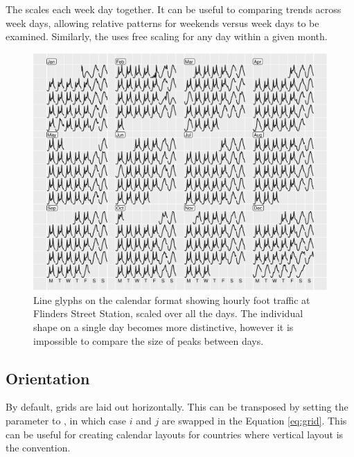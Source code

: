 The  scales each week day together. It can be useful to
comparing trends across week days, allowing relative patterns for
weekends versus week days to be examined. Similarly, the
 uses free scaling for any day within a given month.

\begin{Schunk}
\begin{figure}

{\centering \includegraphics[width=\textwidth]{figure/flinders-free-1} 

}

\caption[Line glyphs on the calendar format showing hourly foot traffic at Flinders Street Station, scaled over all the days]{Line glyphs on the calendar format showing hourly foot traffic at Flinders Street Station, scaled over all the days. The individual shape on a single day becomes more distinctive, however it is impossible to compare the size of peaks between days.}\label{fig:flinders-free}
\end{figure}
\end{Schunk}

\hypertarget{orientation}{%
\subsection{Orientation}\label{orientation}}

By default, grids are laid out horizontally. This can be transposed by
setting the  parameter to , in which case \(i\) and
\(j\) are swapped in the Equation \ref{eq:grid}. This can be useful for
creating calendar layouts for countries where vertical layout is the
convention.

